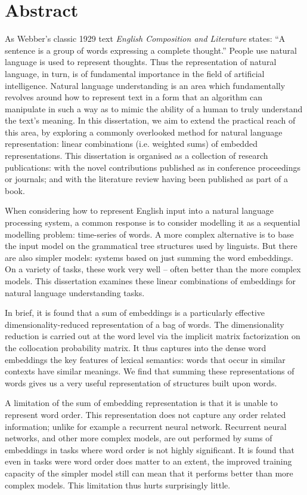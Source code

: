 \documentclass{book}
\begin{document}
\chapter*{Abstract}
As Webber's classic 1929 text \textit{English Composition and Literature} states:
``A sentence is a group of words expressing a complete thought.''
People use natural language is used to represent thoughts.
Thus the representation of natural language, in turn, is of fundamental importance in the field of artificial intelligence.
Natural language understanding is an area which fundamentally revolves around how to represent text in a form that an algorithm can manipulate in such a way as to mimic the ability of a human to truly understand the text's meaning.
In this dissertation, we aim to extend the practical reach of this area,
by exploring a commonly overlooked method for natural language representation: linear combinations (i.e. weighted sums) of embedded representations.
This dissertation is organised as a collection of research publications: with the novel contributions published as in conference proceedings or journals; and with the literature review having been published as part of a book.

When considering how to represent English input into a natural language processing system,
a common response is to consider modelling it as a sequential modelling problem: time-series of words.
A more complex alternative is to base the input model on the grammatical tree structures used by linguists.
But there are also simpler models: systems based on just summing the word embeddings.
On a variety of tasks, these work very well -- often better than the more complex models.
This dissertation examines these linear combinations of embeddings for natural language understanding tasks.

In brief, it is found that a sum of embeddings is a particularly effective dimensionality-reduced representation of a bag of words.
The dimensionality reduction is carried out at the word level via the implicit matrix factorization 
on the collocation probability matrix.
It thus captures into the dense word embeddings the key features of lexical semantics:
words that occur in similar contexts have similar meanings.
We find that summing these representations of words gives us a very useful representation of structures built upon words.

A limitation of the sum of embedding representation is that it is unable to represent word order.
This representation does not capture any order related information; unlike for example a recurrent neural network.
Recurrent neural networks, and other more complex models, are out performed by sums of embeddings in tasks where word order is not highly significant.
It is found that even in tasks were word order does matter to an extent, the improved training capacity of the simpler model still can mean that it performs better than more complex models.
This limitation thus hurts surprisingly little.
\end{document}
